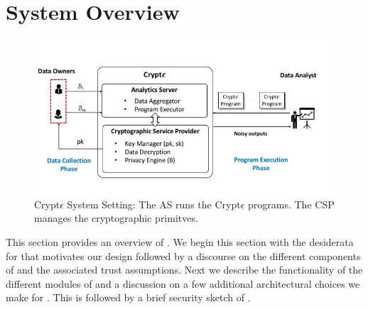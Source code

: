 \section{System Overview}

\begin{figure}
\includegraphics[width=\columnwidth]{cryptE_pic.png}\caption{ Crypt$\epsilon$ System Setting: The  \textsf{AS} runs the Crypt$\epsilon$ programs. The \textsf{CSP} manages the cryptographic primitves. } \end{figure}



This section provides an overview of \system. We begin this section with the desiderata for \system that motivates our design followed by a discourse on the different components of \system and the associated trust assumptions. Next we describe the functionality of the different modules of \system and a discussion on a few additional architectural choices we make for \system. This is followed by a brief security sketch of \system.

